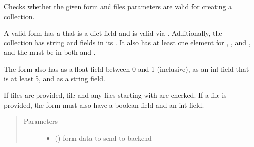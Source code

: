 \documentclass[letterpaper,10pt,english]{sphinxmanual}
\begin{document}
\begin{fulllineitems}
\label{\detokenize{autoapi/pine/client/models/index:pine.client.models.is_valid_collection}}
\sphinxAtStartPar
Checks whether the given form and files parameters are valid for creating a collection.

\sphinxAtStartPar
A valid form has a  that is a dict field and is valid via
{\hyperref[\detokenize{autoapi/pine/client/models/index:pine.client.models.is_valid_eve_collection}]{}}.  Additionally, the collection has string  and
 fields in its .  It also has at least one element for ,
, and , and the  must be in both  and
.

\sphinxAtStartPar
The form also has  as a float field between 0 and 1 (inclusive),  as
an int field that is at least 5, and  as a string field.

\sphinxAtStartPar
If files are provided, file  and any files starting with  are checked.
If a file  is provided, the form must also have a boolean  field and an
int  field.
\begin{quote}\begin{description}
\item[{Parameters}] \leavevmode\begin{itemize}
\item {} 
\sphinxAtStartPar
{} () \textendash{} form data to send to backend


\end{itemize}
\end{description}
\end{quote}
\end{fulllineitems}
\end{document}
